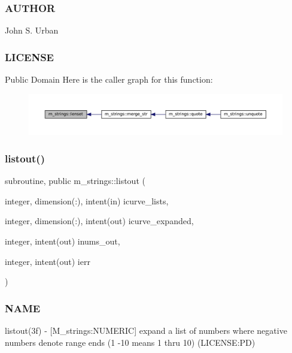 \subsubsection*{A\+U\+T\+H\+OR}

John S. Urban \subsubsection*{L\+I\+C\+E\+N\+SE}

Public Domain Here is the caller graph for this function\+:\nopagebreak
\begin{figure}[H]
\begin{center}
\leavevmode
\includegraphics[width=350pt]{namespacem__strings_a378563bb49f128bf0cf9c9d2b1f34498_icgraph}
\end{center}
\end{figure}
\mbox{\label{namespacem__strings_a81b4b7f4f301b9e17604adbcace58d0c}} 
\subsubsection{\texorpdfstring{listout()}{listout()}}
{\footnotesize\ttfamily subroutine, public m\+\_\+strings\+::listout (\begin{DoxyParamCaption}\item[{integer, dimension(\+:), intent(in)}]{icurve\+\_\+lists,  }\item[{integer, dimension(\+:), intent(out)}]{icurve\+\_\+expanded,  }\item[{integer, intent(out)}]{inums\+\_\+out,  }\item[{integer, intent(out)}]{ierr }\end{DoxyParamCaption})}



\subsubsection*{N\+A\+ME}

listout(3f) -\/ \mbox{[}M\+\_\+strings\+:N\+U\+M\+E\+R\+IC\mbox{]} expand a list of numbers where negative numbers denote range ends (1 -\/10 means 1 thru 10) (L\+I\+C\+E\+N\+SE\+:PD) 

